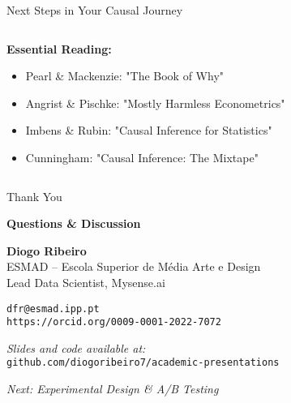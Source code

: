\documentclass[aspectratio=169,11pt]{beamer}
\begin{document}
\begin{frame}{Next Steps in Your Causal Journey}
\begin{columns}
\begin{column}{0.5\textwidth}
\vspace{0.3cm}
\textbf{Essential Reading:}
\begin{itemize}
\item Pearl \& Mackenzie: "The Book of Why"
\item Angrist \& Pischke: "Mostly Harmless Econometrics"
\item Imbens \& Rubin: "Causal Inference for Statistics"
\item Cunningham: "Causal Inference: The Mixtape"
\end{itemize}
\end{column}
\end{columns}
\end{frame}

\begin{frame}
\begin{center}
{\Huge Thank You}

\vspace{0.8cm}

\textbf{Questions \& Discussion}

\vspace{1cm}

\textbf{Diogo Ribeiro}\\
ESMAD -- Escola Superior de Média Arte e Design\\
Lead Data Scientist, Mysense.ai\\

\vspace{0.5cm}

\texttt{dfr@esmad.ipp.pt}\\
\texttt{https://orcid.org/0009-0001-2022-7072}

\vspace{0.8cm}

\textit{Slides and code available at:}\\
\texttt{github.com/diogoribeiro7/academic-presentations}

\vspace{0.5cm}

\textit{Next: Experimental Design \& A/B Testing}
\end{center}
\end{frame}
\end{document}
